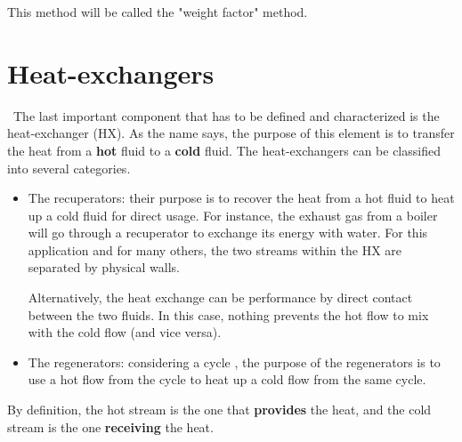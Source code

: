 This method will be called the "weight factor" method. 
\section{Heat-exchangers}
\newpage
\quad\, The last important component that has to be defined and characterized is the heat-exchanger (HX). As the name says, the purpose of this element is to transfer the heat from a \textbf{hot} fluid to a \textbf{cold} fluid. The heat-exchangers can be classified into several categories\citep{Ngendakumana2018}.

\begin{itemize}
\item The recuperators: their purpose is to recover the heat from a hot fluid to heat up a cold fluid for direct usage. For instance, the exhaust gas from a boiler will go through a recuperator to exchange its energy with water. For this application and for many others, the two streams within the HX are separated by physical walls.

Alternatively, the heat exchange can be performance by direct contact between the two fluids. In this case, nothing prevents the hot flow to mix with the cold flow (and vice versa).
\item The regenerators: considering a cycle , the purpose of the regenerators is to use a hot flow from the cycle to heat up a cold flow from the same cycle. 
\end{itemize}

By definition, the hot stream is the one that \textbf{provides} the heat, and the cold stream is the one \textbf{receiving} the heat.

